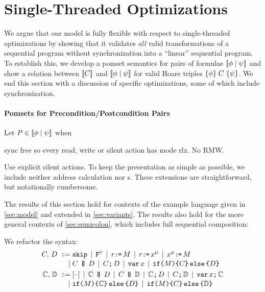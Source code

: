 \section{Single-Threaded Optimizations}
\label{sec:opt}

We argue that our model is fully flexible with respect to single-threaded
optimizations by showing that it validates {\em all} valid transformations of
a sequential program without synchronization into a ``linear'' sequential
program.  To establish this, we develop a pomset semantics for pairs of
formulae $\llbracket\phi\mid\psi\rrbracket$ and show a relation between $\llbracket C\rrbracket$
and $\llbracket\phi\mid\psi\rrbracket$ for valid Hoare triples
$\{\phi\}\allowbreak\;C\;\allowbreak\{\psi\}$.  We end this section with a discussion of
specific optimizations, some of which include synchronization.

\paragraph{Pomsets for Precondition/Postcondition Pairs}

Let
\begin{math}
  P\in\llbracket\phi\mid\psi\rrbracket
\end{math}
when


sync free so every read, write or silent action has mode rlx.  No RMW.


Use explicit silent actions.
    To keep the presentation as simple as possible, we include neither address
calculation nor \RMW{}s.  These extensions are straightforward, but
notationally cumbersome.

The results of this section hold for contexts of the example language
given in \textsection\ref{sec:model} and extended in \textsection\ref{sec:variants}.
The results also hold for the more general contexts of
\textsection\ref{sec:semicolon}, which includes full sequential composition:


We refactor the syntax:
\begin{align*}
  \aCmd,\,\bCmd
  \BNFDEF& \SKIP
  \mkern-2mu\BNFSEP\mkern-2mu \FENCE^{\fmode}
  \mkern-2mu\BNFSEP\mkern-2mu \aReg\GETS\aExp
  \mkern-2mu\BNFSEP\mkern-2mu \aReg\GETS\aLoc^{\amode} 
  \mkern-2mu\BNFSEP\mkern-2mu \aLoc^{\amode}\GETS\aExp
  \\[-.5ex]
  \BNFSEP&\aCmd \PAR \bCmd
  \mkern-2mu\BNFSEP\mkern-2mu\aCmd \SEMI \bCmd
  \mkern-2mu\BNFSEP\mkern-2mu \VAR\aLoc
  \mkern-2mu\BNFSEP\mkern-2mu \IF{\aExp} \THEN \aCmd \ELSE \bCmd \FI
  \\
  \aCtxt,\,\bCtxt
  \BNFDEF& \hole{}
  \mkern-2mu\BNFSEP\mkern-2mu \aCtxt \PAR \bCmd
  \mkern-2mu\BNFSEP\mkern-2mu \aCmd \PAR \bCtxt
  \mkern-2mu\BNFSEP\mkern-2mu \aCtxt \SEMI \bCmd
  \mkern-2mu\BNFSEP\mkern-2mu \aCmd \SEMI \bCtxt
  \mkern-2mu\BNFSEP\mkern-2mu \VAR\aLoc\SEMI \aCtxt
  \\[-.5ex]
  \BNFSEP& \IF{\aExp} \THEN \aCtxt \ELSE \bCmd \FI
  \mkern-2mu\BNFSEP\mkern-2mu \IF{\aExp} \THEN \aCmd \ELSE \bCtxt \FI
\end{align*}

